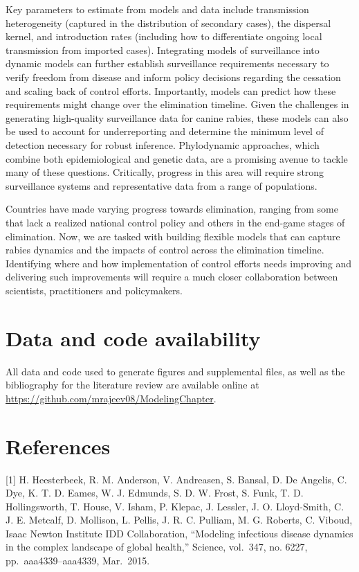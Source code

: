 \documentclass[
]{book}
\begin{document}
Key parameters to estimate from models and data include transmission
heterogeneity (captured in the distribution of secondary cases), the
dispersal kernel, and introduction rates (including how to differentiate
ongoing local transmission from imported cases). Integrating models of
surveillance into dynamic models can further establish surveillance
requirements necessary to verify freedom from disease and inform policy
decisions regarding the cessation and scaling back of control efforts.
Importantly, models can predict how these requirements might change over
the elimination timeline. Given the challenges in generating
high-quality surveillance data for canine rabies, these models can also
be used to account for underreporting and determine the minimum level of
detection necessary for robust inference. Phylodynamic approaches, which
combine both epidemiological and genetic data, are a promising avenue to
tackle many of these questions. Critically, progress in this area will
require strong surveillance systems and representative data from a range
of populations.

Countries have made varying progress towards elimination, ranging from
some that lack a realized national control policy and others in the
end-game stages of elimination. Now, we are tasked with building
flexible models that can capture rabies dynamics and the impacts of
control across the elimination timeline. Identifying where and how
implementation of control efforts needs improving and delivering such
improvements will require a much closer collaboration between
scientists, practitioners and policymakers.

\hypertarget{data-and-code-availability}{%
\section{Data and code availability}\label{data-and-code-availability}}

All data and code used to generate figures and supplemental files, as
well as the bibliography for the literature review are available online
at \url{https://github.com/mrajeev08/ModelingChapter}.

\hypertarget{references-3}{%
\section{References}\label{references-3}}

{[}1{]} H. Heesterbeek, R. M. Anderson, V. Andreasen, S. Bansal, D. De Angelis, C. Dye, K. T. D. Eames, W. J. Edmunds, S. D. W. Frost, S. Funk, T. D. Hollingsworth, T. House, V. Isham, P. Klepac, J. Lessler, J. O. Lloyd-Smith, C. J. E. Metcalf, D. Mollison, L. Pellis, J. R. C. Pulliam, M. G. Roberts, C. Viboud, Isaac Newton Institute IDD Collaboration, ``Modeling infectious disease dynamics in the complex landscape of global health,'' Science, vol.~347, no. 6227, pp.~aaa4339--aaa4339, Mar.~2015.
\end{document}
